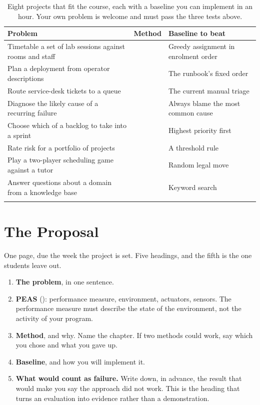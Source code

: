 \smallskip
\noindent\begin{longtable}{@{}L{5.0cm}L{2.5cm}L{7.0cm}@{}}
\toprule
{}
\textbf{Problem} & \textbf{Method} & \textbf{Baseline to beat} \\
\midrule
\endhead
Timetable a set of lab sessions against rooms and staff &  &
Greedy assignment in enrolment order \\
Plan a deployment from operator descriptions &  & The runbook's
fixed order \\
Route service-desk tickets to a queue &  & The current manual
triage \\
Diagnose the likely cause of a recurring failure &  & Always blame
the most common cause \\
Choose which of a backlog to take into a sprint &  & Highest
priority first \\
Rate risk for a portfolio of projects &  & A threshold rule \\
Play a two-player scheduling game against a tutor &  & Random
legal move \\
Answer questions about a domain from a knowledge base &  &
Keyword search \\
\bottomrule
\caption{Eight projects that fit the course, each with a baseline you can implement
in an hour. Your own problem is welcome and must pass the three tests
above.}\label{tab:projects}
\end{longtable}

\section{The Proposal}

One page, due the week the project is set. Five headings, and the fifth is the one
students leave out.

\begin{enumerate}[leftmargin=2.2em, itemsep=3pt, topsep=4pt]
  \item \textbf{The problem}, in one sentence.
  \item \textbf{PEAS} (): performance measure, environment,
        actuators, sensors. The performance measure must describe the state of the
        environment, not the activity of your program.
  \item \textbf{Method}, and why. Name the chapter. If two methods could work, say
        which you chose and what you gave up.
  \item \textbf{Baseline}, and how you will implement it.
  \item \textbf{What would count as failure.} Write down, in advance, the result
        that would make you say the approach did not work. This is the heading that
        turns an evaluation into evidence rather than a demonstration.
\end{enumerate}

